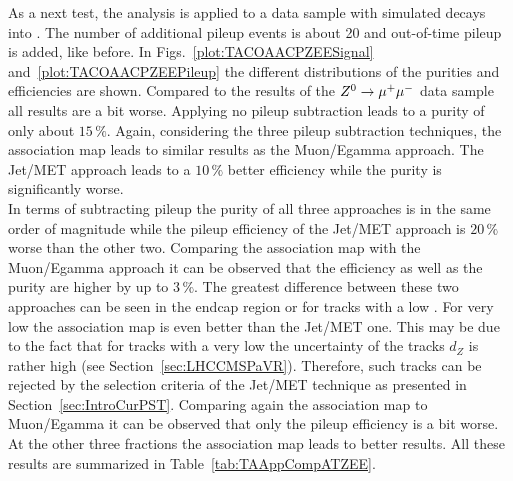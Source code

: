 As a next test, the analysis is applied to a data sample with simulated \Zz decays into \EE. The number of additional pileup events is about 20 and out-of-time pileup is added, like before. In Figs.~\ref{plot:TACOAACPZEESignal} and~\ref{plot:TACOAACPZEEPileup} the different distributions of the purities and efficiencies are shown. Compared to the results of the ${Z^{0}}\rightarrow\mu^+\mu^-$ data sample all results are a bit worse. Applying no pileup subtraction leads to a purity of only about $15\,\%$. Again, considering the three pileup subtraction techniques, the association map leads to similar results as the Muon/Egamma approach. The Jet/MET approach leads to a $10\,\%$ better efficiency while the purity is significantly worse.\\
In terms of subtracting pileup the purity of all three approaches is in the same order of magnitude while the pileup efficiency of the Jet/MET approach is $20\,\%$ worse than the other two. Comparing the association map with the Muon/Egamma approach it can be observed that the efficiency as well as the purity are higher by up to $3\,\%$. The greatest difference between these two approaches can be seen in the endcap region or for tracks with a low \pt. For very low \pt the association map is even better than the Jet/MET one. This may be due to the fact that for tracks with a very low \pt the uncertainty of the tracks $d_{Z}$ is rather high (see Section~\ref{sec:LHCCMSPaVR}). Therefore, such tracks can be rejected by the selection criteria of the Jet/MET technique as presented in Section~\ref{sec:IntroCurPST}. Comparing again the association map to Muon/Egamma it can be observed that only the pileup efficiency is a bit worse. At the other three fractions the association map leads to better results.  All these results are summarized in Table~\ref{tab:TAAppCompATZEE}.

